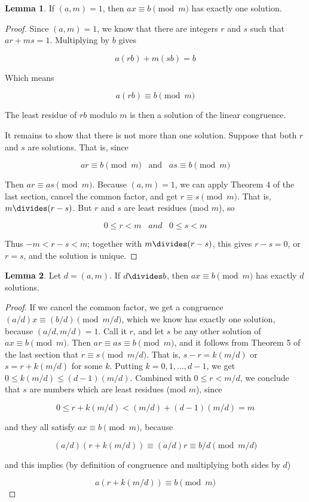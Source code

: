 \documentclass{article}
\theoremstyle{definition} %
\theoremstyle{definition}
\theoremstyle{definition}
\newtheorem{lemma}{Lemma}[section]
\theoremstyle{definition}
\begin{document}
  \begin{lemma}
    If $(a, m) = 1$, then $ax \equiv b \pmod{m}$ has exactly one solution.
  \end{lemma}
  
  \begin{proof}
    Since $(a, m) = 1$, we know that there are integers $r$ and $s$ such that $ar + ms = 1$.
    Multiplying by $b$ gives
    
    \[ a(rb) + m(sb) = b \]
    
    Which means
    
    \[ a(rb) \equiv b \pmod{m} \]
    
    The least residue of $rb$ modulo $m$ is then a solution of the linear congruence.
    
    It remains to show that there is not more than one solution. Suppose that both $r$ and $s$
    are solutions. That is, since
    
    \[ ar \equiv b \pmod{m} \;\;\;\text{and}\;\;\; as \equiv b \pmod{m} \]
    
    Then $ar \equiv as \pmod{m}$. Because $(a, m) = 1$, we can apply Theorem 4 of the last section,
    cancel the common factor, and get $r \equiv s \pmod{m}$. That is, $m \divides (r - s)$. But $r$
    and $s$ are least residues (mod $m$), so
    
    \[ 0 \leq r < m \;\;\;and\;\;\; 0 \leq s < m \]
    
    Thus $-m < r - s < m$; together with $m \divides (r - s)$, this gives $r - s = 0$, or $r = s$, and
    the solution is unique.
  \end{proof}
  
  \begin{lemma}
    Let $d = (a, m)$. If $d \divides b$, then $ax \equiv b \pmod{m}$ has exactly $d$ solutions.
  \end{lemma}
  
  \begin{proof}
    If we cancel the common factor, we get a congruence $(a/d)x \equiv (b/d)\pmod{m/d}$,
    which we know has exactly one solution, because $(a/d, m/d) = 1$. Call it $r$,
    and let $s$ be any other solution of $ax \equiv b \pmod{m}$. Then $ar \equiv as \equiv b
    \pmod{m}$, and it follows from Theorem 5 of the last section that $r \equiv s \pmod{m/d}$.
    That is, $s - r = k(m/d)$ or $s = r + k(m/d)$ for some $k$. Putting $k = 0, 1, \dots, d - 1$,
    we get $0 \leq k(m/d) \leq (d-1)(m/d)$. Combined with $0 \leq r < m/d$, we conclude that
    $s$ are numbers which are least residues (mod $m$), since
    
    \[ 0 \leq r + k(m/d) < (m/d) + (d-1)(m/d) = m \]
    
    and they all satisfy $ax \equiv b \pmod{m}$, because
    
    \[ (a/d)(r + k(m/d)) \equiv (a/d)r \equiv b/d \pmod{m/d} \]
    
    and this implies (by definition of congruence and multiplying both sides by $d$)
    
    \[ a(r + k(m/d)) \equiv b \pmod{m} \]
  \end{proof}
  
\end{document}
